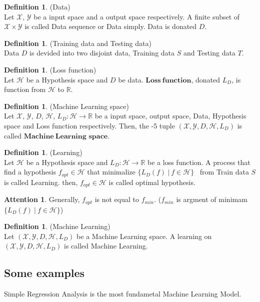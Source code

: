 \documentclass[11pt, a4paper, english, dvipdfmx]{jsarticle}
\theoremstyle{definition}
\newtheorem{Definition+}[Axiom+]{Definition}
\newtheorem{Attention+}[Axiom+]{Attention}
\newcommand{\R}{\mathbb{R}}
\newcommand{\X}{\mathcal{X}}
\newcommand{\Y}{\mathcal{Y}}
\newcommand{\Hil}{\mathcal{H}}
\newcommand{\MLsp}{(\X, \Y, D, \Hil, L_{D})}
\begin{document}
\begin{Definition+}(Data)\\
    Let $\X$, $\Y$ be a input space and a output space respectively.
    A finite subset of $\X\times\Y$ is called Data sequence or Data simply. Data is donated $D$.
\end{Definition+}

\begin{Definition+}(Training data and Testing data)\\
    Data $D$ is devided into two disjoint data, Training data $S$ and Testing data $T$.
\end{Definition+}
\begin{Definition+}(Loss function)\\
    Let $\Hil$ be a Hypothesis space and $D$ be data. $\mathbf{Loss~function}$, donated $L_{D}$, is function from $\Hil$ to $\R$.
\end{Definition+}

\begin{Definition+}(Machine Learning space)\\
    Let $\X$, $\Y$, $D$, $\Hil$, $L_{D}:\Hil\to\R$ be a input space, output space, Data, Hypothesis space and Loss function respectively.
    Then, the -5 tuple $\MLsp$ is called $\mathbf{Machine~Learning}$ $\mathbf{space}$.
\end{Definition+}
\begin{Definition+}(Learning)\\
   Let $\Hil$ be a Hypothesis space and $L_{D}:\Hil\to\R$ be a loss function. A process that find a hypothesis $f_{opt}\in\Hil$ that minimalize $\{L_{D}(f)~|~f\in\Hil\}$ ~from Train data $S$ is called Learning.
   then, $f_{opt}\in\Hil$ is called optimal hypothesis.
\end{Definition+}

\begin{Attention+}
    Generally, $f_{opt}$ is not equal to $f_{min}$. ($f_{min}$ is argment of minimam $\{L_{D}(f)~|~f\in\Hil\}$)
\end{Attention+}

\begin{Definition+}(Machine Learning)\\
    Let $\MLsp$ be a Machine Learning space. A learning on $\MLsp$ is called Machine Learning.
\end{Definition+}
\newpage
\subsection{Some examples}
Simple Regression Analysis is the most fundametal Machine Learning Model.
\end{document}
